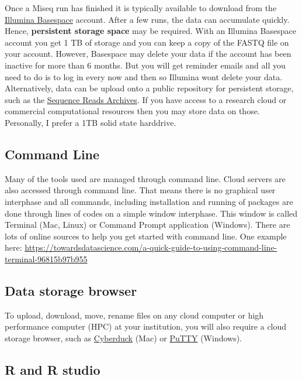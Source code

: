\documentclass[
]{book}
\begin{document}
Once a Miseq run has finished it is typically available to download from the \href{https://basespace.illumina.com/dashboard}{Illumina Basespace} account. After a few runs, the data can accumulate quickly. Hence, \textbf{persistent storage space} may be required. With an Illumina Basespace account you get 1 TB of storage and you can keep a copy of the FASTQ file on your account. However, Basespace may delete your data if the account has been inactive for more than 6 months. But you will get reminder emails and all you need to do is to log in every now and then so Illumina wont delete your data. Alternatively, data can be upload onto a public repository for persistent storage, such as the \href{https://www.ncbi.nlm.nih.gov/sra}{Sequence Reads Archives}. If you have access to a research cloud or commercial computational resources then you may store data on those. Personally, I prefer a 1TB solid state harddrive.

\hypertarget{command-line}{%
\subsection{Command Line}\label{command-line}}

Many of the tools used are managed through command line. Cloud servers are also accessed through command line. That means there is no graphical user interphase and all commands, including installation and running of packages are done through lines of codes on a simple window interphase. This window is called Terminal (Mac, Linux) or Command Prompt application (Windows). There are lots of online sources to help you get started with command line. One example here: \url{https://towardsdatascience.com/a-quick-guide-to-using-command-line-terminal-96815b97b955}

\hypertarget{data-storage-browser}{%
\subsection{Data storage browser}\label{data-storage-browser}}

To upload, download, move, rename files on any cloud computer or high performance computer (HPC) at your institution, you will also require a cloud storage browser, such as \href{https://docs.cyberduck.io/}{Cyberduck} (Mac) or \href{https://www.putty.org/}{PuTTY} (Windows).

\hypertarget{r-and-r-studio}{%
\subsection{R and R studio}\label{r-and-r-studio}}
\end{document}

